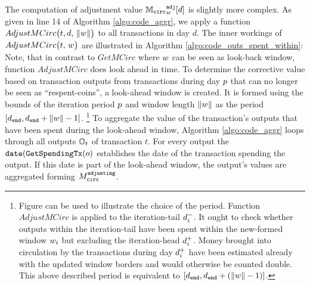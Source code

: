 The computation of adjustment value \({{\mathbb{M}_{\mathtt{circ}}}^{\mathtt{adj}}_{{w}}}[d]\) is slightly more complex. %
As given in line 14 of Algorithm \ref{algo:code_aggr}, we apply a function \(AdjustMCirc\bigl(t, d,\,{\lVert w \rVert}\bigr)\) to all transactions in day \(d\). %
The inner workings of \(AdjustMCirc\bigl(t,\,{w}\bigr)\) are illustrated in Algorithm \ref{algo:code_outs_spent_within}: %
Note, that in contrast to \(GetMCirc\) where \({w}\) can be seen as look-back window, function \(AdjustMCirc\) does look ahead in time. %
To determine the corrective value based on transaction outputs from transactions during day \({p}\) that can no longer be seen as ``respent-coins'', a look-ahead window is created. %
It is formed using the bounds of the iteration period \({p}\) and window length \({\lVert w \rVert}\) as the period \([d_{\mathtt{end}},d_{\mathtt{end}}+{\lVert w \rVert}-1]\).%
\footnote{
Figure  can be used to illustrate the choice of the period. %
Function \(AdjustMCirc\) is applied to the iteration-tail \({d_{{i}}^{-}}\). %
It ought to check whether outputs within the iteration-tail have been spent within the new-formed window \({w}_{{i}}\) but excluding the iteration-head \({d_{{i}}^{+}}\). %
Money brought into circulation by the transactions during day \({d_{{i}}^{+}}\) have been estimated already with the updated window borders and would otherwise be counted double. %
This above described period is equivalent to \([d_{\mathtt{end}},d_{\mathtt{end}}+({\lVert w \rVert}-1)]\). %
} %
To aggregate the value of the transaction's outputs that have been spent during the look-ahead window, Algorithm \ref{algo:code_aggr} loops through all outputs \({\mathbb{O}}_{t}\) of transaction \(t\). %
For every output the \(\mathtt{date}({\mathtt{GetSpendingTx}}(o)\) establishes the date of the transaction spending the output. %
If this date is part of the look-ahead window, the output's values are aggregated forming \({M_{\mathtt{circ}}^{\mathtt{adjusting}}}\). %






